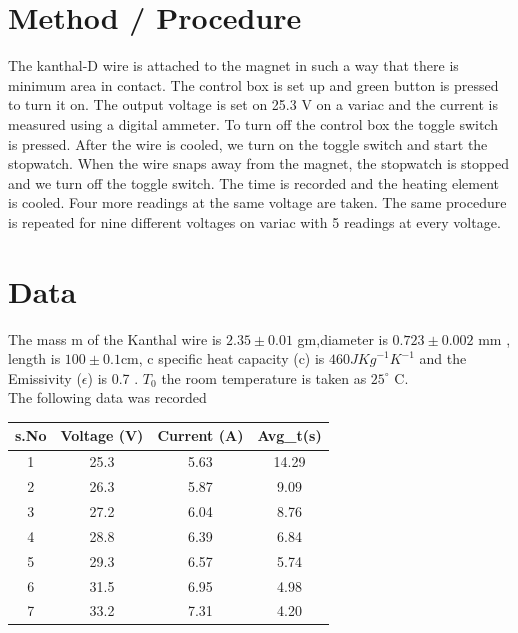 \section{Method / Procedure}
The kanthal-D wire is attached to the magnet in such a way that there is minimum area in contact. The control box is set up and green button is pressed to turn it on. The output voltage is set on 25.3 V on a variac and the current is measured using a digital ammeter. To turn off the control box the toggle switch is pressed. After the wire is cooled, we turn on the toggle switch and start the stopwatch. When the wire snaps away from the magnet, the stopwatch is stopped and we turn off the toggle switch. The time is recorded and the heating element is cooled. Four more readings at the same voltage are taken. The same procedure is repeated for nine different voltages on variac with 5 readings at every voltage.  

\section{Data}

The mass m of the Kanthal wire is $2.35 \pm 0.01$ gm,diameter is  $0.723\pm 0.002$ mm , length is $100 \pm 0.1 $cm, c specific heat capacity (c) is $460 J {Kg}^{-1}{K}^{-1}$ and the Emissivity ($\epsilon $) is 0.7 . $T_0$ the room temperature is taken as $25^\circ$ C.\\
The following data was recorded 
\begin{center}
\begin{tabular}{|c|c|c|c|}
\hline
\textbf{s.No} & \textbf{Voltage (V)} & \textbf{Current (A)} & \textbf{Avg\_t(s)} \\ \hline
1             & 25.3                 & 5.63                 & 14.29              \\ \hline
2             & 26.3                 & 5.87                 & 9.09               \\ \hline
3             & 27.2                 & 6.04                 & 8.76               \\ \hline
4             & 28.8                 & 6.39                 & 6.84               \\ \hline
5             & 29.3                 & 6.57                 & 5.74               \\ \hline
6             & 31.5                 & 6.95                 & 4.98               \\ \hline
7             & 33.2                 & 7.31                 & 4.20               \\ \hline
\end{tabular}
\end{center}

